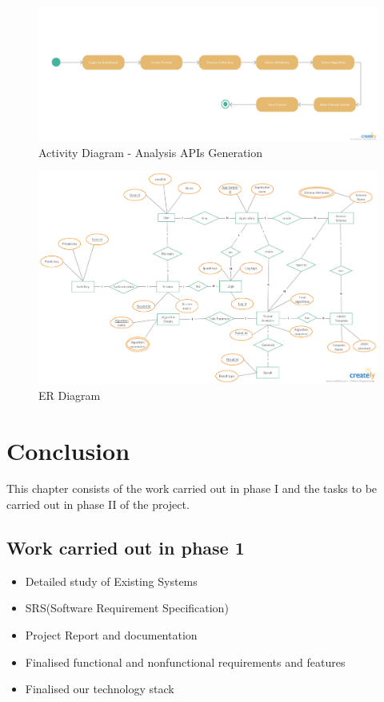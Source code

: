 \documentclass[a4paper,12pt]{report}
\begin{document}
        \begin{figure}[h] \centering
          \includegraphics[width=8.5in , angle=90]{images/PPI.png}
          \caption{ Activity Diagram - Analysis APIs Generation}  
        \end{figure}

        \newpage
        \begin{figure}[h] \centering
          \includegraphics[width=8.5in ,angle=90]{images/ER.jpg}
        \caption{ ER Diagram}  
        \end{figure}

    \chapter {Conclusion}
        This chapter consists of the work carried out in phase I and the tasks to be carried out in phase II of the project.
    \section{Work carried out in phase 1}
    \begin{itemize}
      \item  Detailed study of Existing Systems
      \item  SRS(Software Requirement Specification)
      \item  Project Report and documentation
      \item  Finalised functional and nonfunctional requirements and features
      \item  Finalised our technology stack
    \end{itemize}
\end{document}

